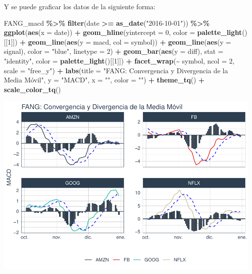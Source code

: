 \documentclass[
]{book}
\newenvironment{Shaded}{\begin{snugshade}}{\end{snugshade}}
\newcommand{\AttributeTok}[1]{\textcolor[rgb]{0.13,0.29,0.53}{#1}}
\newcommand{\DecValTok}[1]{\textcolor[rgb]{0.00,0.00,0.81}{#1}}
\newcommand{\FunctionTok}[1]{\textcolor[rgb]{0.13,0.29,0.53}{\textbf{#1}}}
\newcommand{\NormalTok}[1]{#1}
\newcommand{\SpecialCharTok}[1]{\textcolor[rgb]{0.81,0.36,0.00}{\textbf{#1}}}
\newcommand{\StringTok}[1]{\textcolor[rgb]{0.31,0.60,0.02}{#1}}
\begin{document}
Y se puede graficar los datos de la siguiente forma:

\begin{Shaded}
\begin{Highlighting}[]
\NormalTok{FANG\_macd }\SpecialCharTok{\%\textgreater{}\%}
    \FunctionTok{filter}\NormalTok{(date }\SpecialCharTok{\textgreater{}=} \FunctionTok{as\_date}\NormalTok{(}\StringTok{"2016{-}10{-}01"}\NormalTok{)) }\SpecialCharTok{\%\textgreater{}\%}
    \FunctionTok{ggplot}\NormalTok{(}\FunctionTok{aes}\NormalTok{(}\AttributeTok{x =}\NormalTok{ date)) }\SpecialCharTok{+} 
    \FunctionTok{geom\_hline}\NormalTok{(}\AttributeTok{yintercept =} \DecValTok{0}\NormalTok{, }\AttributeTok{color =} \FunctionTok{palette\_light}\NormalTok{()[[}\DecValTok{1}\NormalTok{]]) }\SpecialCharTok{+}
    \FunctionTok{geom\_line}\NormalTok{(}\FunctionTok{aes}\NormalTok{(}\AttributeTok{y =}\NormalTok{ macd, }\AttributeTok{col =}\NormalTok{ symbol)) }\SpecialCharTok{+}
    \FunctionTok{geom\_line}\NormalTok{(}\FunctionTok{aes}\NormalTok{(}\AttributeTok{y =}\NormalTok{ signal), }\AttributeTok{color =} \StringTok{"blue"}\NormalTok{, }\AttributeTok{linetype =} \DecValTok{2}\NormalTok{) }\SpecialCharTok{+}
    \FunctionTok{geom\_bar}\NormalTok{(}\FunctionTok{aes}\NormalTok{(}\AttributeTok{y =}\NormalTok{ diff), }\AttributeTok{stat =} \StringTok{"identity"}\NormalTok{, }\AttributeTok{color =} \FunctionTok{palette\_light}\NormalTok{()[[}\DecValTok{1}\NormalTok{]]) }\SpecialCharTok{+}
    \FunctionTok{facet\_wrap}\NormalTok{(}\SpecialCharTok{\textasciitilde{}}\NormalTok{ symbol, }\AttributeTok{ncol =} \DecValTok{2}\NormalTok{, }\AttributeTok{scale =} \StringTok{"free\_y"}\NormalTok{) }\SpecialCharTok{+}
    \FunctionTok{labs}\NormalTok{(}\AttributeTok{title =} \StringTok{"FANG: Convergencia y Divergencia de la Media Móvil"}\NormalTok{,}
         \AttributeTok{y =} \StringTok{"MACD"}\NormalTok{, }\AttributeTok{x =} \StringTok{""}\NormalTok{, }\AttributeTok{color =} \StringTok{""}\NormalTok{) }\SpecialCharTok{+}
    \FunctionTok{theme\_tq}\NormalTok{() }\SpecialCharTok{+}
    \FunctionTok{scale\_color\_tq}\NormalTok{()}
\end{Highlighting}
\end{Shaded}

\includegraphics{Libro_TidyQualityTools_files/figure-latex/unnamed-chunk-67-1.pdf}
\end{document}
